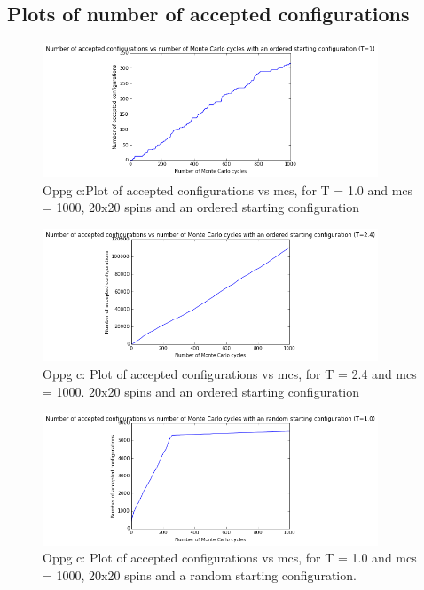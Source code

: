 \documentclass[twocolumn]{article}
\begin{document}
\centering\subsection{Plots of number of accepted configurations}

\begin{figure}[h!]
  \centering
  \caption{Oppg c:Plot of accepted configurations vs mcs, for T = 1.0 and mcs = 1000, 20x20 spins and an ordered starting configuration}
  \includegraphics[width=10cm]{configs_plot_1.png}
\end{figure}

\begin{figure}[h!]
  \centering
  \caption{Oppg c: Plot of accepted configurations vs mcs, for T = 2.4 and mcs = 1000. 20x20 spins and an ordered starting configuration}
  \includegraphics[width=10cm]{configs_plot_2.png}
\end{figure}

\begin{figure}[h!]
  \centering
  \caption{Oppg c: Plot of accepted configurations vs mcs, for T = 1.0 and mcs = 1000, 20x20 spins and a random starting configuration.}
  \includegraphics[width=10cm]{configs_plot_3.png}
\end{figure}
\newpage

\newpage
\end{document}
